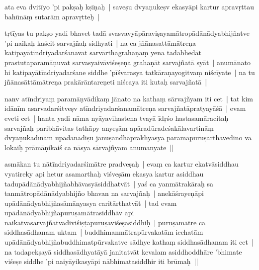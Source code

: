 \documentclass[article,12pt,a4paper]{memoir}
\begin{document}
	

	  \pstart ata eva dvitīyo 'pi pakṣaḥ kṣīṇaḥ | saveṣu dvyaṇukeṣv ekasyāpi kartur apravṛttau bahūnāṃ sutarām apravṛtteḥ |
	\pend
      

	  \pstart tṛ\leavevmode{}\label{RNAms_32a}tīyas tu pakṣo yadi bhavet tadā svasvavyāpāraviṣayamātropādānādyabhijñatve 'pi naikaḥ kaścit sarvajñaḥ sidhyati | na ca \label{rnā__151710}jñānasattāmātreṇa\label{rnā__151759} katipayātīndriyadarśanavat sarvārthagrahaṇaṃ yena tadabhedāt prastutaparamāṇuvat sarvasyaivāviśeṣeṇa grahaṇāt sarvajñatā syāt | anumānato hi katipayātīndriyadarśane siddhe 'pīśvarasya tatkāraṇayogitvaṃ niścīyate | na tu jñānasāttāmātreṇa prakārāntareṇeti niścaya iti kutaḥ sarvajñatā |
	\pend
      

	  \pstart nanv atīndriyaṃ paramāṇvādikaṃ jānato na kathaṃ sārvajñyam iti cet | tat kim idānīm asarvadarśitveṣv atīndriyadarśanamātreṇa sarvajñatāpratyayāśā | evam eveti cet | hanta yadi nāma nyāyavihastena tvayā īdṛśo hastasamāracitaḥ sarvajñaḥ paribhāvitas tathāpy anyeṣām apāradūradeśakālavartināṃ dvyaṇukādīnām upādānādiṣu januṣāndhaprakhyasya paramapuruṣārthāvedino vā lokaiḥ prāmāṇikaiś ca nāsya sārvajñyam anumanyate ||
	\pend
      

	  \pstart asmākan tu nātīndriyadarśimātre pradveṣaḥ | evaṃ ca kartur ekatvāsiddhau vyatireky api hetur asamarthaḥ viśveṣām ekasya kartur asiddhau tadupādānādyabhijñabhāvasyāsiddhatvāt | yaś ca yanmātrakāraḥ sa tanmātropādānādyabhijño bhavan na sarvajñaḥ | anekāśrayeṇāpi upādānādyabhijñasāmānyasya caritārthatvāt | tad evam upādānādyabhijñapuruṣamātrasiddhāv api naikatvasarvajñatvādiviśiṣṭapuruṣaviśeṣasiddhiḥ | puruṣamātre ca siddhasādhanam uktam | buddhimanmātrapūrvakatām icchatām upādānādyabhijñabuddhimatpūrvakatve sādhye kathaṃ \label{ratnakīrtinibandhāvali__36r1NMNKPK8I8K079OIC2E8BVU5}siddhasādhanam\label{ratnakīrtinibandhāvali__36r1NMNKPKAMZXOQ29O4V14D9F6} iti cet | na tadapekṣayā siddhasādhyatāyā janitatvāt kevalam asiddhoddhāre 'bhimate viśeṣe siddhe 'pi naiyāyikasyāpi nābhimatasiddhir iti brūmaḥ ||
	\pend
      
\end{document}
